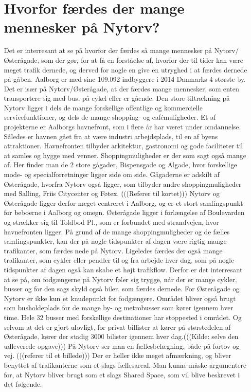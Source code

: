 \section{Hvorfor færdes der mange mennesker på Nytorv?}
\label{sec:hvorfor_faerdes_der_mange_mennesker_paa_nytorv?}
Det er interresant at se på hvorfor der færdes så mange mennesker på Nytorv/Østerågade, som der gør, for at få en forståelse af, hvorfor der til tider kan være meget trafik dernede, og derved for nogle en give en utryghed i at færdes dernede på gåben.
Aalborg er med sine 109.092 indbyggere i 2014 Danmarks 4 største by.%
Det er især på Nytorv/Østerågade, at der færdes mange mennesker, som enten transportere sig med bus, på cykel eller er gående. Den store tiltrækning på Nytorv ligger i dels de mange forskellige offentlige og kommercielle servicefunktioner, og dels de mange shopping- og cafémuligheder. 
Et af projekterne er Aalborgs havnefront, som i flere år har været under omdannelse. Således er havnen gået fra at være industri arbejdsplads, til en af byens attraktioner. Havnefronten tilbyder arkitektur, gastronomi og gode faciliteter til at samles og hygge med venner.
Shoppingmuligheder er der som sagt også mange af. Her finder man de 2 store gågader, Bispensgade og Algade, hvor forskellige mode- og specialforretninger ligger side om side. Gågaderne er adskilt af Østerågade, hvorfra Nytorv også ligger, som tilbyder andre shoppingmuligheder med Salling, Friis Citycenter og Føtex. (((Referer til kortet)))
Nytorv og Østerågade ligger derfor meget centreret i Aalborg, og er et stort samlingspunkt for beboerne i Aalborg og omegn. Østerågade ligger i forlængelse af Boulevarden og strækker sig til Toldbod Pl., som er forbundet med strandvejen, hvor havnefronten ligger. På grund af de mange shoppingmuligheder og de fælles samlingspunkter, kan der på nogle tidspunkter af dagen være rigtig mange trafikanter, som færdes nede på Nytorv. Ligeledes færdes der også mange trafikanter, som cykler eller pendler til og fra arbejde hver dag, som på nogle tidspunkter af dagen også kan skabe et højt trafikflow. Derfor er det interresant at se på, om fodgængerne på Nytorv føler sig trygge, når der er mange cykler, busser og for den sags skyld også biler, som færdes dernede. For Østerågade og Nytorv er ikke kun et knudepunkt for fodgængere. Området bliver også brugt som busholdeplads for de mange by- og metrobusser som kører igennem hver time. Hele 32 busser med forskellige destinationer har stoppested i området. Og selvom at det er gjort ulovligt, for privat billister at kører på størstedelen af Østerågade, kører der stadig 3000 bilister igennem hver dag.(((Kilde: selve den udleverede opgave)))  På Nytorv ser man en fællesbelægning, både på fortov og vej. (((referer til et billede))) Der er heller ikke meget afmærkning, og bliver benyttet af trafikanterne som et slags fællesareal. Man kunne måske argumentere for, at Nytorv bliver brugt som et slags Shared Space, som vil blive beskrevet i det følgende. 
